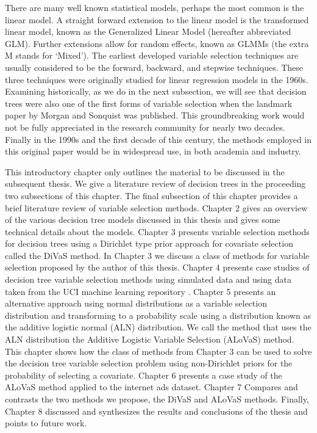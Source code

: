 There are many well known statistical models, perhaps the most common is the linear model. A straight forward extension to the linear model is the transformed linear model, known as the Generalized Linear Model (hereafter abbreviated GLM).  Further extensions allow for random effects, known as GLMMs (the extra M stands for `Mixed'). The earliest developed variable selection techniques are usually considered to be the forward, backward, and stepwise techniques. These three techniques were originally studied for linear regression models in the 1960s. Examining historically, as we do in the next subsection, we will see that decision trees were also one of the first forms of variable selection when the landmark paper by Morgan and Sonquist \cite{morgan1963problems} was published. This groundbreaking work would not be fully appreciated in the research community for nearly two decades. Finally in the 1990s and the first decade of this century, the methods employed in this original paper would be in widespread use, in both academia and industry. 

This introductory chapter only outlines the material to be discussed in the subsequent thesis. We give a literature review of decision trees in the proceeding two subsections of this chapter. The final subsection of this chapter provides a brief literature review of variable selection methods. Chapter 2 gives an overview of the various decision tree models discussed in this thesis and gives some technical details about the models. Chapter 3 presents variable selection methods for decision trees using a Dirichlet type prior approach for covariate selection called the DiVaS method. In Chapter 3 we discuss a class of methods for variable selection proposed by the author of this thesis. Chapter 4 presents case studies of decision tree variable selection methods using simulated data and using data taken from the UCI machine learning repository \cite{Frank:2010uq}. Chapter 5 presents an alternative approach using normal distributions as a variable selection distribution and transforming to a probability scale using a distribution known as the additive logistic normal (ALN)  distribution. We call the method that uses the ALN distribution the Additive Logistic Variable Selection (ALoVaS) method. 
This chapter shows how the class of methods from Chapter 3 can be used to solve the decision tree variable selection problem using non-Dirichlet priors for the probability of selecting a covariate. Chapter 6 presents a case study of the ALoVaS method applied to the internet ads dataset. Chapter 7 Compares  and contrasts the two methods we propose, the DiVaS  and ALoVaS  methods. Finally, Chapter 8 discussed and synthesizes the results and conclusions of the thesis and points to future work. %


